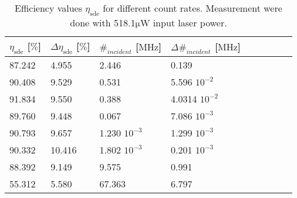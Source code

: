 
\begin{table}[!hbt]
    \centering
    \begin{tabular}{|l|l|l|l|l|l|l|l|l|}
    \hline
         $\eta_{\text{sde}} $ [$\%$] &  $ \Delta \eta_{\text{sde}} $ [$\%$] & $ \#_{incident} $ [$\si{\mega \Hz}$]
    & $ \Delta \#_{incident} $ [$\si{\mega \Hz}$] \\ \hline
        87.242 & 4.955  & 2.446            & 0.139\\ \hline
        90.408 & 9.529  & 0.531  & 5.596  $10^{-2}$\\ \hline
        91.834 & 9.550  & 0.388  & 4.0314 $10^{-2}$\\ \hline
        89.760 & 9.448  & 0.067  & 7.086 $10^{-3}$\\ \hline
        90.793 & 9.657  & 1.230 $10^{-3}$   & 1.299 $10^{-3}$\\ \hline
        90.332 & 10.416 & 1.802 $10^{-3}$  & 0.201 $10^{-3}$\\ \hline
        88.392 & 9.149  & 9.575            & 0.991\\ \hline
        55.312 & 5.580  & 67.363   & 6.797\\ \hline
    \end{tabular}
    \caption{ Efficiency values $\eta_{\text{sde}}$ for different count rates.
    Measurement were done with 518.1$ \si{\micro \W}$ input laser power.}
    \label{tab:sde_count_rate_table}
\end{table}


